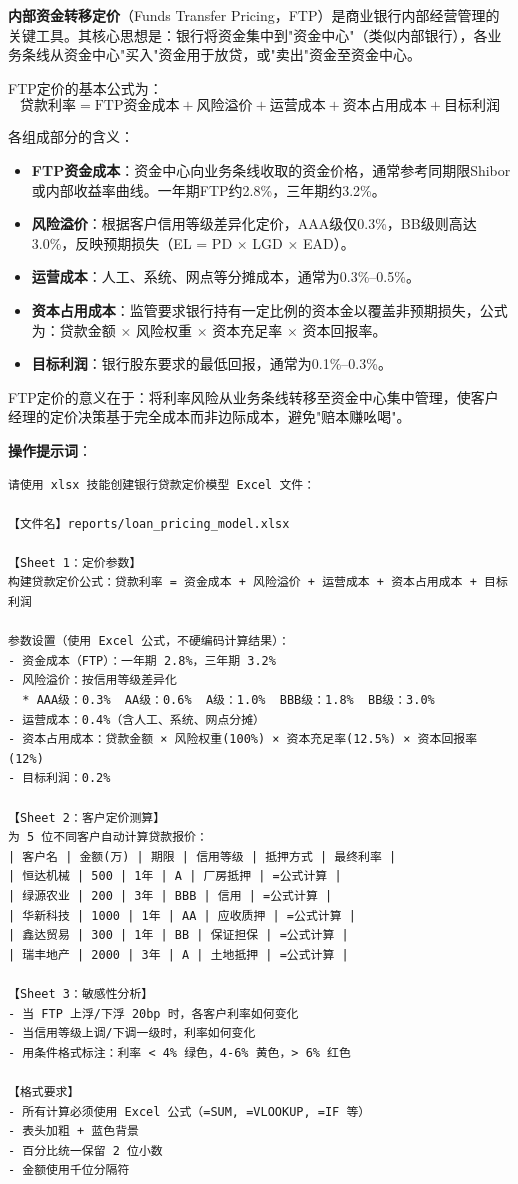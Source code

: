 \begin{theorybox}[FTP转移定价理论基础]
\textbf{内部资金转移定价}（Funds Transfer Pricing，FTP）是商业银行内部经营管理的关键工具。其核心思想是：银行将资金集中到"资金中心"（类似内部银行），各业务条线从资金中心"买入"资金用于放贷，或"卖出"资金至资金中心。

FTP定价的基本公式为：
\[
\text{贷款利率} = \text{FTP资金成本} + \text{风险溢价} + \text{运营成本} + \text{资本占用成本} + \text{目标利润}
\]

各组成部分的含义：
\begin{itemize}[leftmargin=1em]
  \item \textbf{FTP资金成本}：资金中心向业务条线收取的资金价格，通常参考同期限Shibor或内部收益率曲线。一年期FTP约2.8\%，三年期约3.2\%。
  \item \textbf{风险溢价}：根据客户信用等级差异化定价，AAA级仅0.3\%，BB级则高达3.0\%，反映预期损失（EL = PD $\times$ LGD $\times$ EAD）。
  \item \textbf{运营成本}：人工、系统、网点等分摊成本，通常为0.3\%--0.5\%。
  \item \textbf{资本占用成本}：监管要求银行持有一定比例的资本金以覆盖非预期损失，公式为：贷款金额 $\times$ 风险权重 $\times$ 资本充足率 $\times$ 资本回报率。
  \item \textbf{目标利润}：银行股东要求的最低回报，通常为0.1\%--0.3\%。
\end{itemize}

FTP定价的意义在于：将利率风险从业务条线转移至资金中心集中管理，使客户经理的定价决策基于完全成本而非边际成本，避免"赔本赚吆喝"。
\end{theorybox}

\textbf{操作提示词}：

\begin{lstlisting}
请使用 xlsx 技能创建银行贷款定价模型 Excel 文件：

【文件名】reports/loan_pricing_model.xlsx

【Sheet 1：定价参数】
构建贷款定价公式：贷款利率 = 资金成本 + 风险溢价 + 运营成本 + 资本占用成本 + 目标利润

参数设置（使用 Excel 公式，不硬编码计算结果）：
- 资金成本（FTP）：一年期 2.8%，三年期 3.2%
- 风险溢价：按信用等级差异化
  * AAA级：0.3%  AA级：0.6%  A级：1.0%  BBB级：1.8%  BB级：3.0%
- 运营成本：0.4%（含人工、系统、网点分摊）
- 资本占用成本：贷款金额 × 风险权重(100%) × 资本充足率(12.5%) × 资本回报率(12%)
- 目标利润：0.2%

【Sheet 2：客户定价测算】
为 5 位不同客户自动计算贷款报价：
| 客户名 | 金额(万) | 期限 | 信用等级 | 抵押方式 | 最终利率 |
| 恒达机械 | 500 | 1年 | A | 厂房抵押 | =公式计算 |
| 绿源农业 | 200 | 3年 | BBB | 信用 | =公式计算 |
| 华新科技 | 1000 | 1年 | AA | 应收质押 | =公式计算 |
| 鑫达贸易 | 300 | 1年 | BB | 保证担保 | =公式计算 |
| 瑞丰地产 | 2000 | 3年 | A | 土地抵押 | =公式计算 |

【Sheet 3：敏感性分析】
- 当 FTP 上浮/下浮 20bp 时，各客户利率如何变化
- 当信用等级上调/下调一级时，利率如何变化
- 用条件格式标注：利率 < 4% 绿色，4-6% 黄色，> 6% 红色

【格式要求】
- 所有计算必须使用 Excel 公式（=SUM, =VLOOKUP, =IF 等）
- 表头加粗 + 蓝色背景
- 百分比统一保留 2 位小数
- 金额使用千位分隔符
\end{lstlisting}

